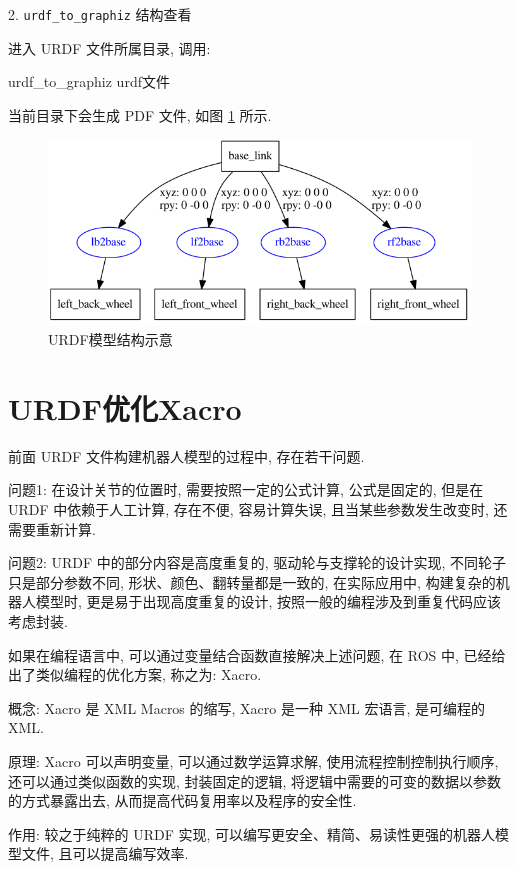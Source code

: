 \documentclass[openany, fontset=windowsold]{ctexbook}
\theoremstyle{kaiti}
\theoremstyle{normal}
\begin{document}
2. \verb|urdf_to_graphiz| 结构查看

进入 URDF 文件所属目录, 调用:

\begin{bash}
  urdf_to_graphiz urdf文件
\end{bash}

当前目录下会生成 PDF 文件, 如图 \ref{fig:urdf_to_graphiz} 所示.

\begin{figure}[!ht]
  \centering
  \includegraphics[width=.8\textwidth]{urdf_to_graphiz.png}
  \caption{URDF模型结构示意}
  \label{fig:urdf_to_graphiz}
\end{figure}

\section{URDF优化Xacro}

前面 URDF 文件构建机器人模型的过程中, 存在若干问题.

问题1: 在设计关节的位置时, 需要按照一定的公式计算, 公式是固定的, 但是在 URDF 中依赖于人工计算, 存在不便, 容易计算失误, 且当某些参数发生改变时, 还需要重新计算.

问题2: URDF 中的部分内容是高度重复的, 驱动轮与支撑轮的设计实现, 不同轮子只是部分参数不同, 形状、颜色、翻转量都是一致的, 在实际应用中, 构建复杂的机器人模型时, 更是易于出现高度重复的设计, 按照一般的编程涉及到重复代码应该考虑封装.

如果在编程语言中, 可以通过变量结合函数直接解决上述问题, 在 ROS 中, 已经给出了类似编程的优化方案, 称之为: Xacro.

概念: Xacro 是 XML Macros 的缩写, Xacro 是一种 XML 宏语言, 是可编程的 XML.

原理: Xacro 可以声明变量, 可以通过数学运算求解, 使用流程控制控制执行顺序, 还可以通过类似函数的实现, 封装固定的逻辑, 将逻辑中需要的可变的数据以参数的方式暴露出去, 从而提高代码复用率以及程序的安全性.

作用: 较之于纯粹的 URDF 实现, 可以编写更安全、精简、易读性更强的机器人模型文件, 且可以提高编写效率.
\end{document}
